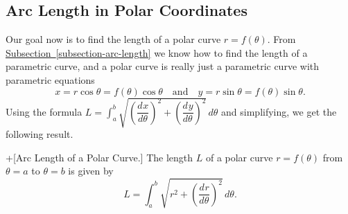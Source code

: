 \documentclass[10pt,]{book}
\theoremstyle{ptxplainnotitle}
\theoremstyle{ptxplaintitle}
\theoremstyle{ptxplainnotitle}
\theoremstyle{ptxplaintitle}
\theoremstyle{ptxplainnotitle}
\theoremstyle{ptxplaintitle}
\theoremstyle{ptxdefinitionnotitle}
\theoremstyle{ptxdefinitiontitle}
\theoremstyle{ptxdefinitionnotitle}
\theoremstyle{ptxdefinitiontitle}
\theoremstyle{ptxdefinitionnotitle}
\theoremstyle{ptxdefinitiontitle}
\theoremstyle{ptxdefinitionnotitle}
\theoremstyle{ptxdefinitiontitle}
\theoremstyle{ptxdefinitionnotitle}
\theoremstyle{ptxdefinitiontitle}
\numberwithin{equation}{section}
\newcommand{\dv}[3][]{\dfrac{d^{#1} #2}{d #3^{#1}}}
\begin{document}
\subsection[{Arc Length in Polar Coordinates}]{Arc Length in Polar Coordinates}\label{subsection-arc-length-in-polar-coordinates}
\hypertarget{p-712}{}%
Our goal now is to find the length of a polar curve \(r=f(\theta)\). From \hyperref[subsection-arc-length]{Subsection~\ref{subsection-arc-length}} we know how to find the length of a parametric curve, and a polar curve is really just a parametric curve with parametric equations%
%
\begin{equation*}
x = r\cos\theta = f(\theta)\cos\theta \quad\text{and}\quad y = r\sin\theta = f(\theta)\sin\theta.
\end{equation*}
\hypertarget{p-713}{}%
Using the formula \(L = \int_{a}^{b}\sqrt{(\dv{x}{\theta})^{2}+(\dv{y}{\theta})^{2}}\,d\theta\) and simplifying, we get the following result.%
\begin{theorem}+[{Arc Length of a Polar Curve.}]\label{theorem-arc-length-of-a-polar-curve}
\hypertarget{p-714}{}%
The length \(L\) of a polar curve \(r = f(\theta)\) from \(\theta=a\) to \(\theta=b\) is given by%
\begin{equation*}
L = \int_{a}^{b}\sqrt{r^{2} + \left(\dv{r}{\theta}\right)^{2}}\,d\theta.
\end{equation*}
%
\end{theorem}
\end{document}
